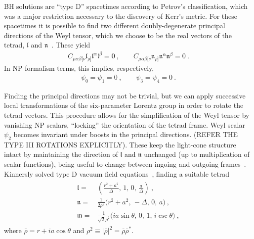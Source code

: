 BH solutions are ``type D'' spacetimes according to Petrov's classification, which was a major restriction necessary to the discovery of Kerr's metric.
For these spacetimes it is possible to find two different doubly-degenerate principal directions of the Weyl tensor, which we choose to be the real vectors of the tetrad, $\bm{\mathfrak{l}}$ and $\bm{\mathfrak{n}}$~\cite{Chandrasekhar1998}.
These yield
\begin{align}
    C_{\mu\alpha\beta[\nu} \mathfrak{l}_{\rho]} \mathfrak{l}^\alpha \mathfrak{l}^\beta = 0 ~, \qquad C_{\mu\alpha\beta[\nu} \mathfrak{n}_{\rho]} \mathfrak{n}^\alpha \mathfrak{n}^\beta = 0  ~.
\end{align}
In NP formalism terms, this implies, respectively,
\begin{align}
    \psi_0=\psi_1=0 ~,\qquad \psi_3=\psi_4=0 ~.
\end{align}

Finding the principal directions may not be trivial, but we can apply successive local transformations of the six-parameter Lorentz group in order to rotate the tetrad vectors. 
This procedure allows for the simplification of the Weyl tensor by vanishing NP scalars, ``locking'' the orientation of the tetrad frame.
Weyl scalar $\psi_2$ becomes invariant under boosts in the principal directions.
(REFER THE TYPE III ROTATIONS EXPLICITLY).
These keep the light-cone structure intact by maintaining the direction of $\bm{\mathfrak{l}}$ and $\bm{\mathfrak{n}}$ unchanged (up to multiplication of scalar functions), being useful to change between ingoing and outgoing frames~\cite{Teukolsky1974}. 
Kinnersly solved type D vacuum field equations~\cite{Kinnersley1969}, finding a suitable tetrad 
\begin{align}
    \label{eq3:kinnerslytetrad}
    \begin{split}
        \bm{\mathfrak{l}} =& \left(\frac{r^2+a^2}{\Delta}, \, 1, \,0, \,\frac{a}{\Delta} \right) ~, \\
        \bm{\mathfrak{n}} =& \frac{1}{2 \rho^2} \Bigr( r^2+a^2, \,-\Delta, \,0 , \,a \Bigr) ~, \\
        \bm{\mathfrak{m}} =& \frac{1}{ \sqrt{2} \bar{\rho}^2 } \Bigr( i a \sin\theta, \,0, \,1, \, i \csc\theta \Bigr) ~,
    \end{split}
\end{align}
where $\bar{\rho} = r + i a \cos\theta$ and $\rho^2 \equiv | \bar{\rho} |^2 = \bar{\rho} \bar{\rho}^*$.


